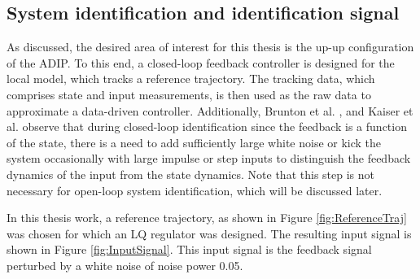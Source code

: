 \subsection{System identification and identification signal}
\label{sec:Results_ident}
As discussed, the desired area of interest for this thesis is the up-up configuration of the ADIP. To this end, a closed-loop feedback controller is designed for the local model, which tracks a reference trajectory. The tracking data, which comprises state and input measurements, is then used as the raw data to approximate a data-driven controller. Additionally, Brunton et al. \cite{SINDyc}, and Kaiser et al. \cite{kaiser2020datadriven} observe that during closed-loop identification since the feedback is a function of the state, there is a need to add sufficiently large white noise or kick the system occasionally with large impulse or step inputs to distinguish the feedback dynamics of the input from the state dynamics. Note that this step is not necessary for open-loop system identification, which will be discussed later.\par
In this thesis work, a reference trajectory, as shown in Figure \ref{fig:ReferenceTraj} was chosen for which an LQ regulator was designed. The resulting input signal is shown in Figure \ref{fig:InputSignal}. This input signal is the feedback signal perturbed by a white noise of noise power 0.05. \\
